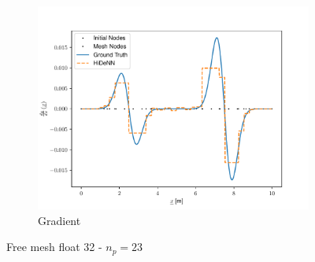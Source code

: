 \begin{figure}
\begin{subfigure}{0.3\linewidth}
        \includegraphics[width=\linewidth]{Figures/Solution_gradients_Regul32.pdf}
        \caption{Gradient}
    \end{subfigure}
    \caption{Free mesh float 32 - $n_p=23$}
    \label{fig:Fixed_Mesh23Float32}
\end{figure}

